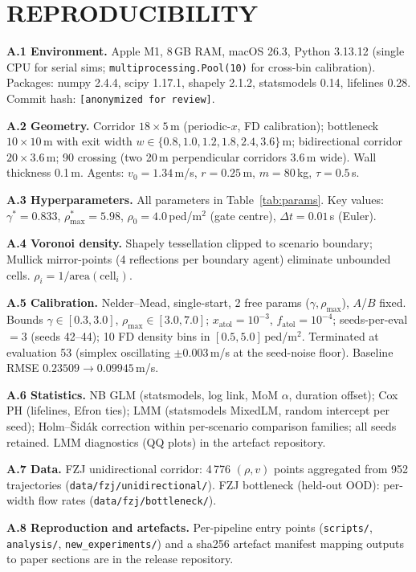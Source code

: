 \documentclass[a4paper,twoside]{article}
\begin{document}
\appendix

\section{\uppercase{Reproducibility}}
\label{sec:appendix}

\footnotesize

\textbf{A.1 Environment.} Apple M1, 8\,GB RAM, macOS 26.3, Python 3.13.12 (single CPU for serial sims; \texttt{multiprocessing.Pool(10)} for cross-bin calibration). Packages: numpy 2.4.4, scipy 1.17.1, shapely 2.1.2, statsmodels 0.14, lifelines 0.28. Commit hash: \texttt{[anonymized for review]}.

\textbf{A.2 Geometry.} Corridor $18{\times}5$\,m (periodic-$x$, FD calibration); bottleneck $10{\times}10$\,m with exit width $w\!\in\!\{0.8,1.0,1.2,1.8,2.4,3.6\}$\,m; bidirectional corridor $20{\times}3.6$\,m; 90\textdegree{} crossing (two 20\,m perpendicular corridors 3.6\,m wide). Wall thickness 0.1\,m. Agents: $v_0{=}1.34$\,m/s, $r{=}0.25$\,m, $m{=}80$\,kg, $\tau{=}0.5$\,s.

\textbf{A.3 Hyperparameters.} All parameters in Table~\ref{tab:params}. Key values: $\gamma^*{=}0.833$, $\rho_{\max}^*{=}5.98$, $\rho_0{=}4.0$\,ped/m$^2$ (gate centre), $\Delta t{=}0.01$\,s (Euler).

\textbf{A.4 Voronoi density.} Shapely tessellation clipped to scenario boundary; Mullick mirror-points (4 reflections per boundary agent) eliminate unbounded cells. $\rho_i{=}1/\text{area}(\text{cell}_i)$.

\textbf{A.5 Calibration.} Nelder--Mead, single-start, 2 free params ($\gamma,\rho_{\max}$), $A$/$B$ fixed. Bounds $\gamma\!\in\![0.3,3.0]$, $\rho_{\max}\!\in\![3.0,7.0]$; $x_{\text{atol}}{=}10^{-3}$, $f_{\text{atol}}{=}10^{-4}$; seeds-per-eval $=3$ (seeds 42--44); 10 FD density bins in $[0.5,5.0]$\,ped/m$^2$. Terminated at evaluation 53 (simplex oscillating $\pm 0.003$\,m/s at the seed-noise floor). Baseline RMSE $0.23509\!\to\!0.09945$\,m/s.

\textbf{A.6 Statistics.} NB GLM (statsmodels, log link, MoM $\alpha$, duration offset); Cox PH (lifelines, Efron ties); LMM (statsmodels MixedLM, random intercept per seed); Holm--\v{S}id\'ak correction within per-scenario comparison families; all seeds retained. LMM diagnostics (QQ plots) in the artefact repository.

\textbf{A.7 Data.} FZJ unidirectional corridor: 4\,776 $(\rho,v)$ points aggregated from 952 trajectories (\texttt{data/fzj/unidirectional/}). FZJ bottleneck (held-out OOD): per-width flow rates (\texttt{data/fzj/bottleneck/}).

\textbf{A.8 Reproduction and artefacts.} Per-pipeline entry points (\texttt{scripts/}, \texttt{analysis/}, \texttt{new\_experiments/}) and a sha256 artefact manifest mapping outputs to paper sections are in the release repository.

\normalsize
\end{document}
